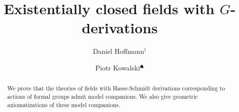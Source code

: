 \documentclass[10pt]{amsart}
\title{Existentially closed fields with ${G}$-derivations}
\author[D. HOFFMANN]{Daniel Hoffmann$^{\dagger}$}
\author[P. KOWALSKI]{Piotr Kowalski$^{\spadesuit}$}
\DeclareMathOperator{\ddf}{DF}\DeclareMathOperator{\dcf}{DCF}\DeclareMathOperator{\scf}{SCF}\DeclareMathOperator{\Hom}{Hom}\DeclareMathOperator{\lin}{Span}
\theoremstyle{definition}
\begin{document}
\newcommand{\twoc}[3]{ {#1} \choose {{#2}|{#3}}}
\newcommand{\thrc}[4]{ {#1} \choose {{#2}|{#3}|{#4}}}
\newcommand{\Zz}{{\mathds{Z}}}
\newcommand{\Ff}{{\mathds{F}}}
\newcommand{\Cc}{{\mathds{C}}}
\newcommand{\Rr}{{\mathds{R}}}
\newcommand{\Nn}{{\mathds{N}}}
\newcommand{\Qq}{{\mathds{Q}}}
\newcommand{\Kk}{{\mathds{K}}}
\newcommand{\Pp}{{\mathds{P}}}
\newcommand{\ddd}{\mathrm{d}}
\newcommand{\Aa}{\mathds{A}}
\newcommand{\dlog}{\mathrm{ld}}
\newcommand{\ga}{\mathbb{G}_{\rm{a}}}
\newcommand{\gm}{\mathbb{G}_{\rm{m}}}
\newcommand{\gaf}{\widehat{\mathbb{G}}_{\rm{a}}}
\newcommand{\gmf}{\widehat{\mathbb{G}}_{\rm{m}}}
\newcommand{\gdf}{\mathfrak{g}-\ddf}
\newcommand{\gdcf}{\mathfrak{g}-\dcf}
\newcommand{\fdf}{F-\ddf}
\newcommand{\fdcf}{F-\dcf}



\maketitle
\begin{abstract}
We prove that the theories of fields with Hasse-Schmidt derivations corresponding to actions of formal groups admit model companions. We also give geometric axiomatizations of these model companions.
\end{abstract}
\end{document}

